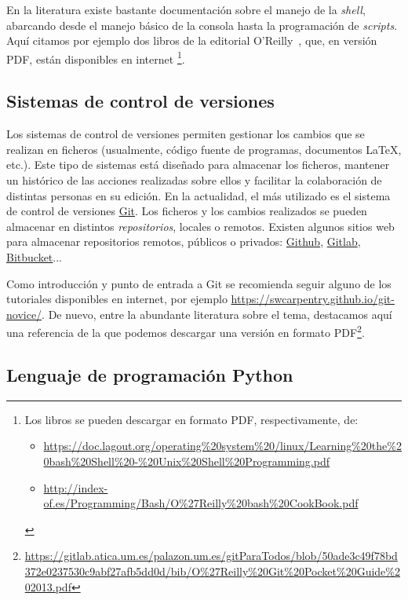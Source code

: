En la literatura existe bastante documentación sobre el manejo de la
\textit{shell}, abarcando desde el manejo básico de la consola hasta
la programación de \textit{scripts}. Aquí citamos por ejemplo dos
libros de la editorial O'Reilly~\cite{Newham-bash,Albing-Vosen-Bash},
que, en versión PDF, están disponibles en internet%
\footnote{Los libros se pueden descargar en formato PDF,
  respectivamente, de:
  \begin{itemize}
  \item \url{https://doc.lagout.org/operating\%20system\%20/linux/Learning\%20the\%20bash\%20Shell\%20-\%20Unix\%20Shell\%20Programming.pdf}
  \item \url{http://index-of.es/Programming/Bash/O\%27Reilly\%20bash\%20CookBook.pdf}
  \end{itemize}
  }.

\subsection{Sistemas de control de versiones}
Los sistemas de control de versiones permiten gestionar los cambios que se realizan en ficheros (usualmente, código fuente de programas, documentos \LaTeX, etc.). Este tipo de sistemas está diseñado para almacenar los ficheros, mantener un histórico de las acciones realizadas sobre ellos y facilitar la colaboración de distintas personas en su edición. En la actualidad, el más utilizado es el sistema de control de versiones \href{https://git-scm.com/}{Git}. Los ficheros y los cambios realizados se pueden almacenar en distintos \textit{repositorios}, locales o remotos. Existen algunos sitios web para almacenar repositorios remotos, públicos o privados: \href{https://github.com}{Github}, \href{https://gitlab.com/}{Gitlab}, \href{https://bitbucket.org}{Bitbucket}...

Como introducción y punto de entrada a Git se recomienda seguir alguno de los tutoriales disponibles en internet, por ejemplo \url{https://swcarpentry.github.io/git-novice/}. De nuevo, entre la abundante literatura sobre el tema, destacamos aquí una referencia de la que podemos descargar una versión en formato PDF\footnote{\url{https://gitlab.atica.um.es/palazon.um.es/gitParaTodos/blob/50ade3c49f78bd372e0237530c9abf27afb5dd0d/bib/O\%27Reilly\%20Git\%20Pocket\%20Guide\%202013.pdf}}.

\subsection{Lenguaje de programación Python}
\label{sec:python}



